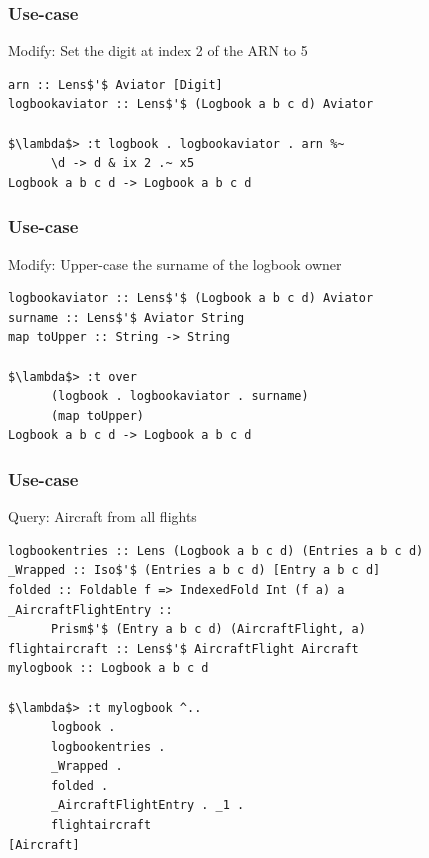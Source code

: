 \begin{frame}[fragile]
\frametitle{Use-case}
\begin{block}{Modify: Set the digit at index 2 of the ARN to 5}
\begin{lstlisting}[style=haskell,basicstyle=\scriptsize\ttfamily,mathescape]
arn :: Lens$'$ Aviator [Digit]
logbookaviator :: Lens$'$ (Logbook a b c d) Aviator

$\lambda$> :t logbook . logbookaviator . arn %~
      \d -> d & ix 2 .~ x5
Logbook a b c d -> Logbook a b c d
\end{lstlisting}
\end{block}
\end{frame}

\begin{frame}[fragile]
\frametitle{Use-case}
\begin{block}{Modify: Upper-case the surname of the logbook owner}
\begin{lstlisting}[style=haskell,basicstyle=\scriptsize\ttfamily,mathescape]
logbookaviator :: Lens$'$ (Logbook a b c d) Aviator
surname :: Lens$'$ Aviator String
map toUpper :: String -> String

$\lambda$> :t over
      (logbook . logbookaviator . surname)
      (map toUpper)
Logbook a b c d -> Logbook a b c d
\end{lstlisting}
\end{block}
\end{frame}

\begin{frame}[fragile]
\frametitle{Use-case}
\begin{block}{Query: Aircraft from all flights}
\begin{lstlisting}[style=haskell,basicstyle=\scriptsize\ttfamily,mathescape]
logbookentries :: Lens (Logbook a b c d) (Entries a b c d)
_Wrapped :: Iso$'$ (Entries a b c d) [Entry a b c d]
folded :: Foldable f => IndexedFold Int (f a) a 
_AircraftFlightEntry ::
      Prism$'$ (Entry a b c d) (AircraftFlight, a)
flightaircraft :: Lens$'$ AircraftFlight Aircraft
mylogbook :: Logbook a b c d

$\lambda$> :t mylogbook ^..
      logbook .
      logbookentries .
      _Wrapped .
      folded .
      _AircraftFlightEntry . _1 .
      flightaircraft
[Aircraft]
\end{lstlisting}
\end{block}
\end{frame}

